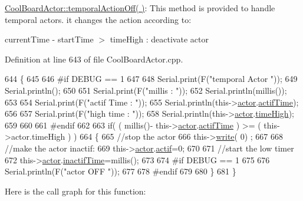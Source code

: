 \hyperlink{class_cool_board_actor_a02698bd647df49cabbe74513d4d88918}{Cool\+Board\+Actor\+::temporal\+Action\+Off( )}\+: This method is provided to handle temporal actors. it changes the action according to\+:

current\+Time -\/ start\+Time $>$ time\+High \+: deactivate actor 

Definition at line 643 of file Cool\+Board\+Actor.\+cpp.


\begin{DoxyCode}
644 \{
645 
646 \textcolor{preprocessor}{#if DEBUG == 1}
647     
648     Serial.print(F(\textcolor{stringliteral}{"temporal Actor  "}));
649     Serial.println();
650 
651     Serial.print(F(\textcolor{stringliteral}{"millis : "}));
652     Serial.println(millis());
653 
654     Serial.print(F(\textcolor{stringliteral}{"actif Time : "}));
655     Serial.println(this->\hyperlink{class_cool_board_actor_a8f190db9f7a39fddbcef7f152da970e9}{actor}.\hyperlink{struct_cool_board_actor_1_1state_a534119a22a09b29ecb446b277d5b2ef5}{actifTime});
656 
657     Serial.print(F(\textcolor{stringliteral}{"high time : "}));
658     Serial.println(this->\hyperlink{class_cool_board_actor_a8f190db9f7a39fddbcef7f152da970e9}{actor}.\hyperlink{struct_cool_board_actor_1_1state_a54cd4976b56aeaa6274fe0576aaebb0f}{timeHigh});
659 
660 
661 \textcolor{preprocessor}{#endif}
662     
663     \textcolor{keywordflow}{if}( ( millis()- this->\hyperlink{class_cool_board_actor_a8f190db9f7a39fddbcef7f152da970e9}{actor}.\hyperlink{struct_cool_board_actor_1_1state_a534119a22a09b29ecb446b277d5b2ef5}{actifTime}  ) >= (  this->actor.timeHigh  ) )
664     \{
665         \textcolor{comment}{//stop the actor}
666         this->\hyperlink{class_cool_board_actor_a958786ff01ea1056ee72c72d439f86da}{write}( 0) ;
667 
668         \textcolor{comment}{//make the actor inactif:}
669         this->\hyperlink{class_cool_board_actor_a8f190db9f7a39fddbcef7f152da970e9}{actor}.\hyperlink{struct_cool_board_actor_1_1state_a7963178c2de01ef0d2861f9f59ad6f3c}{actif}=0;
670 
671         \textcolor{comment}{//start the low timer}
672         this->\hyperlink{class_cool_board_actor_a8f190db9f7a39fddbcef7f152da970e9}{actor}.\hyperlink{struct_cool_board_actor_1_1state_a6d88835f4402b3b81cd404784281854b}{inactifTime}=millis();
673 
674 \textcolor{preprocessor}{    #if DEBUG == 1 }
675 
676         Serial.println(F(\textcolor{stringliteral}{"actor OFF "}));
677     
678 \textcolor{preprocessor}{    #endif}
679                 
680     \}   
681 \}
\end{DoxyCode}
Here is the call graph for this function\+:\nopagebreak
